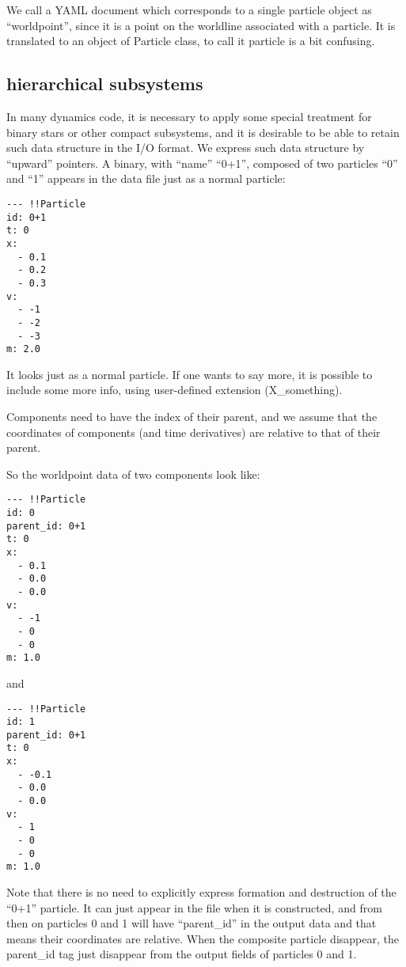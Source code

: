 \documentclass[12pt]{article}
\begin{document}
We call a YAML document which corresponds to a single particle object
as ``worldpoint'', since it is a point on the worldline associated
with a particle. It is translated to an object of Particle class, to
call it particle is a bit confusing.

\subsection{hierarchical subsystems}

In many dynamics code, it is necessary to apply some special treatment
for binary stars or other compact subsystems, and it is desirable to
be able to  retain such data structure in the I/O format. We express
such data structure by ``upward'' pointers. A binary, with ``name''
``0+1'', composed of two particles ``0'' and ``1'' appears in the data
file just as a normal particle:


\begin{verbatim}
--- !!Particle
id: 0+1
t: 0
x:
  - 0.1
  - 0.2
  - 0.3
v:
  - -1
  - -2
  - -3
m: 2.0
\end{verbatim}

It looks just as a normal particle. If one wants to say more, it is
possible to include some more info, using user-defined extension
(X\_something).

Components need to have the index of their parent, and we assume that
the coordinates of components (and time derivatives) are relative to
that of their parent.

So the worldpoint data of two components look like:

\begin{verbatim}
--- !!Particle
id: 0
parent_id: 0+1
t: 0
x:
  - 0.1
  - 0.0
  - 0.0
v:
  - -1
  - 0
  - 0
m: 1.0
\end{verbatim}

and

\begin{verbatim}
--- !!Particle
id: 1
parent_id: 0+1
t: 0
x:
  - -0.1
  - 0.0
  - 0.0
v:
  - 1
  - 0
  - 0
m: 1.0
\end{verbatim}


Note that there is no need to explicitly express formation and
destruction of the  ``0+1'' particle. It can just appear in the file
when it is constructed, and from then on particles 0 and 1 will have
``parent\_id'' in the output data and that means their coordinates are
relative. When the composite particle disappear, the parent\_id tag
just disappear from the output fields of particles 0 and 1.
\end{document}
